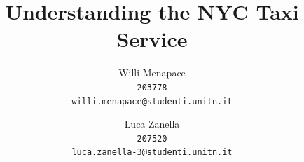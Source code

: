 \documentclass{acm_proc_article-sp-sigmod09}
\begin{document}
%

\title{Understanding the NYC Taxi Service}


\author{
	Willi Menapace\\
	\texttt{203778}\\
	\texttt{willi.menapace@studenti.unitn.it}
	\and
	Luca Zanella\\
	\texttt{207520}\\
	\texttt{luca.zanella-3@studenti.unitn.it}
}

%
%
\end{document}
